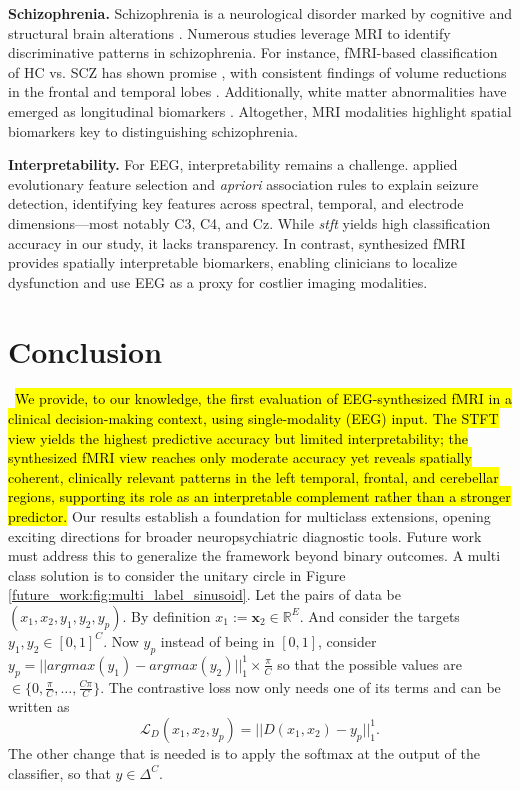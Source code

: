 \documentclass{article}
\begin{document}
\noindent\textbf{Schizophrenia.}\label{related_work:schizophrenia} Schizophrenia is a neurological disorder marked by cognitive and structural brain alterations \cite{sui2018multimodal}. Numerous studies leverage MRI to identify discriminative patterns in schizophrenia. For instance, fMRI-based classification of HC vs. SCZ has shown promise \cite{de2019machine}, with consistent findings of volume reductions in the frontal and temporal lobes \cite{chin2018recognition}. Additionally, white matter abnormalities have emerged as longitudinal biomarkers \cite{cetin2020white}. Altogether, MRI modalities highlight spatial biomarkers key to distinguishing schizophrenia.

\noindent\textbf{Interpretability.}\label{related_work:interpretability} For EEG, interpretability remains a challenge. \citet{pinto2022interpretable} applied evolutionary feature selection and \textit{apriori} association rules to explain seizure detection, identifying key features across spectral, temporal, and electrode dimensions—most notably C3, C4, and Cz. While \textit{stft} yields high classification accuracy in our study, it lacks transparency. In contrast, synthesized fMRI provides spatially interpretable biomarkers, enabling clinicians to localize dysfunction and use EEG as a proxy for costlier imaging modalities.

\section{Conclusion}\label{section:conclusion}\
\hl{We provide, to our knowledge, the first evaluation of EEG-synthesized fMRI in a clinical decision-making context, using single-modality (EEG) input. The STFT view yields the highest predictive accuracy but limited interpretability; the synthesized fMRI view reaches only moderate accuracy yet reveals spatially coherent, clinically relevant patterns in the left temporal, frontal, and cerebellar regions, supporting its role as an interpretable complement rather than a stronger predictor.} Our results establish a foundation for multiclass extensions, opening exciting directions for broader neuropsychiatric diagnostic tools. Future work must address this to generalize the framework beyond binary outcomes. A multi class solution is to consider the unitary circle in Figure \ref{future_work:fig:multi_label_sinusoid}. Let the pairs of data be $(x_1, x_2, y_1, y_2, y_p)$. By definition $x_1 := \mathbf{x}_2 \in \mathbb{R}^E$. And consider the targets $y_1, y_2 \in [0,1]^C$. Now $y_p$ instead of being in $[0,1]$, consider $y_p=||argmax(y_1) - argmax(y_2)||_1^1 \times \frac{\pi}{C}$ so that the possible values are $\in \{0,\frac{\pi}{C}, \dots, \frac{C\pi}{C}\}$. The contrastive loss now only needs one of its terms and can be written as
\begin{equation}\label{future_work:equation:multi_contrastive}
    \mathcal{L}_D(x_1, x_2, y_p) = ||D(x_1, x_2)-y_p||_1^1 .
\end{equation}
The other change that is needed is to apply the softmax at the output of the classifier, so that $y\in \Delta^C$.
\end{document}
